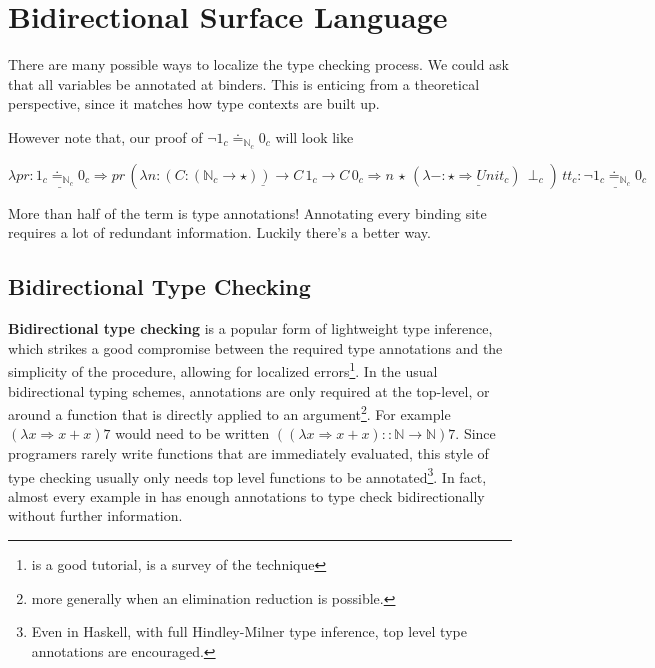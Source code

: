 \section{Bidirectional Surface Language}

There are many possible ways to localize the type checking process.
We could ask that all variables be annotated at binders.
This is enticing from a theoretical perspective, since it matches how type contexts are built up.

However note that, our proof of $\lnot1_{c}\doteq_{\mathbb{N}_{c}}0_{c}$ will look like

$\lambda pr\underline{:1_{c}\doteq_{\mathbb{N}_{c}}0_{c}}\Rightarrow pr\,\left(\lambda n:\underline{\left(C:\left(\mathbb{N}_{c}\rightarrow\star\right)\right)\rightarrow C\,1_{c}\rightarrow C\,0_{c}}\Rightarrow n\,\star\,(\lambda-:\underline{\star\Rightarrow Unit_{c}})\,\perp_{c}\right)\,tt_{c}:\underline{\lnot1_{c}\doteq_{\mathbb{N}_{c}}0_{c}}$

More than half of the term is type annotations!
Annotating every binding site requires a lot of redundant information.
Luckily there's a better way.

\subsection{Bidirectional Type Checking}

\textbf{Bidirectional type checking} is a popular form of lightweight type inference, which strikes a good compromise between the required type annotations and the simplicity of the procedure, allowing for localized errors\footnote{\cite{christiansen2013bidirectional} is a good tutorial, \cite{10.1145/3450952} is a survey of the technique}.
In the usual bidirectional typing schemes, annotations are only required at the top-level, or around a function that is directly applied to an argument\footnote{more generally when an elimination reduction is possible.}.
For example $(\lambda x\Rightarrow x+x)7$ would need to be written $\left((\lambda x\Rightarrow x+x)::\mathbb{N}\rightarrow\mathbb{N}\right)7$.
Since programers rarely write functions that are immediately evaluated, this style of type checking usually only needs top level functions to be annotated\footnote{Even in Haskell, with full Hindley-Milner type inference, top level type annotations are encouraged.}.
In fact, almost every example in  has enough annotations to type check bidirectionally without further information.


